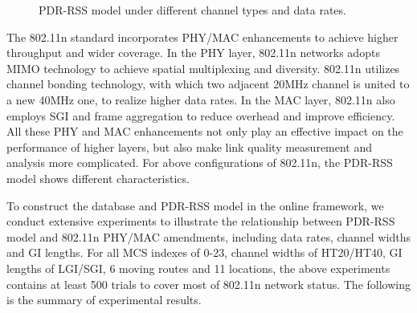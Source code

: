 \documentclass[journal,onecolumn,12pt]{IEEEtran}
\begin{document}
\begin{figure}[!t]
\centerline{
}
\caption{PDR-RSS model under different channel types and data rates.}
\label{pdr}
\end{figure}

The 802.11n standard incorporates PHY/MAC enhancements to achieve higher throughput and wider coverage. In the PHY layer, 802.11n networks adopts MIMO technology to achieve spatial multiplexing and diversity. 802.11n utilizes channel bonding technology, with which two adjacent 20MHz channel is united to a new 40MHz one, to realize higher data rates. In the MAC layer, 802.11n also employs SGI and frame aggregation to reduce overhead and improve efficiency. All these PHY and MAC enhancements not only play an effective impact on the performance of higher layers, but also make link quality measurement and analysis more complicated. For above configurations of 802.11n, the PDR-RSS model shows different characteristics.

To construct the database and PDR-RSS model in the online framework, we conduct extensive experiments to illustrate the relationship between PDR-RSS model and 802.11n PHY/MAC amendments, including data rates, channel widths and GI lengths. For all MCS indexes of 0-23, channel widths of HT20/HT40, GI lengths of LGI/SGI, 6 moving routes and 11 locations, the above experiments contains at least 500 trials to cover most of 802.11n network status. The following is the summary of experimental results.
\end{document}
